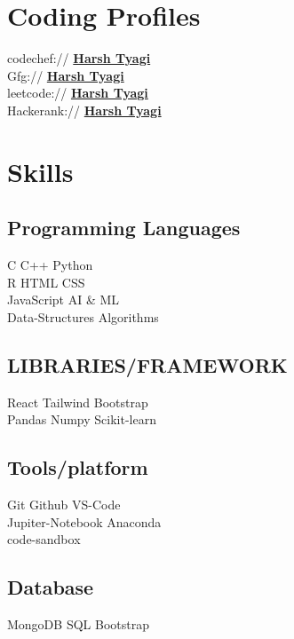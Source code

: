 \documentclass[]{deedy-resume-openfont}
\begin{document}
\begin{minipage}[t]{0.33\textwidth}
\section{Coding Profiles} 
codechef:// \href{https://www.codechef.com/users/harshtyagi_25}{\bf Harsh Tyagi} \\
Gfg:// \href{https://auth.geeksforgeeks.org/user/tyagi7x27}{\bf Harsh Tyagi} \\
leetcode://  \href{https://leetcode.com/h_tya6i/}{\bf Harsh Tyagi} \\
Hackerank://  \href{https://www.hackerrank.com/CSB_21B0121120}{\bf Harsh Tyagi} \\


\section{Skills}
\subsection{Programming Languages}
\textbullet{} C\textbullet{}   C++\textbullet{}  Python \\
\textbullet{} R \textbullet{} HTML \textbullet{} CSS \\ 
\textbullet{} JavaScript \textbullet{} AI \& ML \\
\textbullet{} Data-Structures \textbullet{} Algorithms \\
\sectionsep
\subsection{LIBRARIES/FRAMEWORK}
\textbullet React \textbullet{}   Tailwind\textbullet{}  Bootstrap \\
\textbullet Pandas \textbullet{}   Numpy\textbullet{}  Scikit-learn \\
\sectionsep
\subsection{Tools/platform}
\textbullet Git \textbullet{}   Github\textbullet{}  VS-Code \\
\textbullet Jupiter-Notebook \textbullet{}   Anaconda\\
\textbullet{}  code-sandbox \\
\sectionsep
\subsection{Database}
 \textbullet MongoDB \textbullet{}   SQL\textbullet{}  Bootstrap \\
\sectionsep

\end{minipage}
\end{document}
